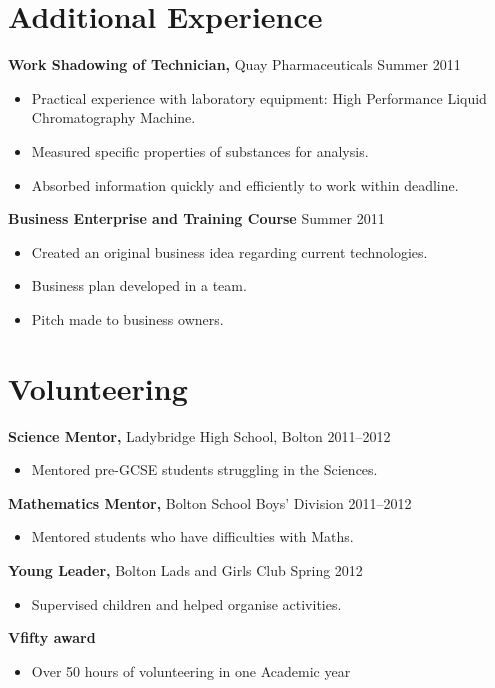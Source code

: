 \documentclass[margin]{res}
\begin{document}
\begin{resume}
\begin{itemize}
 \end{itemize}


 \section{Additional Experience} 
{\bf Work Shadowing of Technician,} Quay Pharmaceuticals \hfill  Summer 2011
\begin{itemize} \itemsep -2pt %
\item Practical experience with laboratory equipment: High Performance Liquid Chromatography Machine.
\item Measured specific properties of substances for analysis.
\item Absorbed information quickly and efficiently to work within deadline.
\end{itemize}

{\bf Business Enterprise and Training Course} \hfill Summer 2011
\begin{itemize} \itemsep -2pt
\item Created an original business idea regarding current technologies.
\item Business plan developed in a team.
\item Pitch made to business owners.
\end{itemize}


\section{Volunteering} 
               {\bf Science Mentor,} Ladybridge High School, Bolton    \hfill       2011--2012
                \begin{itemize} \itemsep -2pt
              \item Mentored pre-GCSE students struggling in the Sciences.
         		\end{itemize}
		{\bf Mathematics Mentor,} Bolton School Boys' Division \hfill 2011--2012
                \begin{itemize} \itemsep -2pt
                 \item  Mentored students who have difficulties with Maths.
		 \end{itemize}
                  {\bf  Young Leader,} Bolton Lads and Girls Club    \hfill   Spring 2012
                 \begin{itemize} \itemsep -2pt
               \item    Supervised children and helped organise activities.
		\end{itemize}
	{\bf Vfifty award}
	\begin{itemize}
	\item Over 50 hours of volunteering in one Academic year 
		 \end{itemize}


\end{resume}
\end{document}
